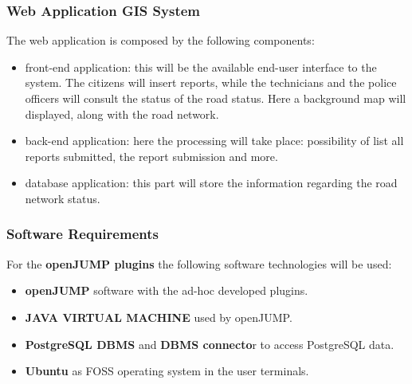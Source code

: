 \subsubsection{Web Application GIS System}
The web application is composed by the following components:
\begin{itemize}
    \item front-end application: this will be the available end-user interface to the system. The citizens will insert reports, while the technicians and the police officers will consult the status of the road status.
    Here a background map will displayed, along with the road network.
    \item back-end application: here the processing will take place: possibility of list all reports submitted, the report submission and more.
    \item database application: this part will store the information regarding the road network status.
\end{itemize}

\subsubsection{Software Requirements}
For the \textbf{openJUMP plugins} the following software technologies will be used:
\begin{itemize}
    \item \textbf{openJUMP} software with the ad-hoc developed plugins.
    \item \textbf{JAVA VIRTUAL MACHINE} used by openJUMP. 
    \item \textbf{PostgreSQL DBMS} and \textbf{DBMS connecto}r to access PostgreSQL data.
    \item \textbf{Ubuntu} as FOSS operating system in the user terminals. 
\end{itemize}


